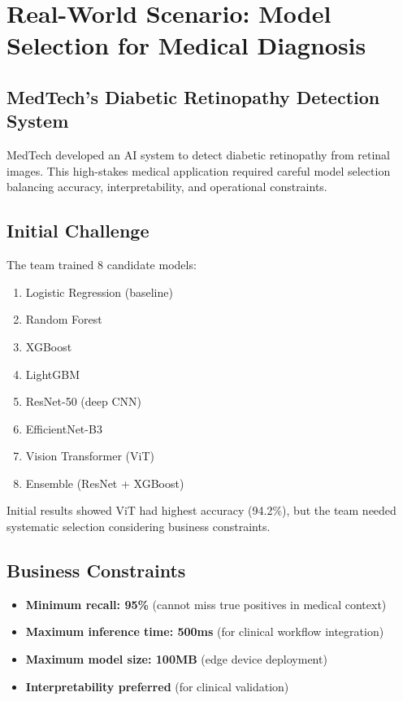 \section{Real-World Scenario: Model Selection for Medical Diagnosis}

\subsection{MedTech's Diabetic Retinopathy Detection System}

MedTech developed an AI system to detect diabetic retinopathy from retinal images. This high-stakes medical application required careful model selection balancing accuracy, interpretability, and operational constraints.

\subsection{Initial Challenge}

The team trained 8 candidate models:

\begin{enumerate}
    \item Logistic Regression (baseline)
    \item Random Forest
    \item XGBoost
    \item LightGBM
    \item ResNet-50 (deep CNN)
    \item EfficientNet-B3
    \item Vision Transformer (ViT)
    \item Ensemble (ResNet + XGBoost)
\end{enumerate}

Initial results showed ViT had highest accuracy (94.2\%), but the team needed systematic selection considering business constraints.

\subsection{Business Constraints}

\begin{itemize}
    \item \textbf{Minimum recall: 95\%} (cannot miss true positives in medical context)
    \item \textbf{Maximum inference time: 500ms} (for clinical workflow integration)
    \item \textbf{Maximum model size: 100MB} (edge device deployment)
    \item \textbf{Interpretability preferred} (for clinical validation)
\end{itemize}

